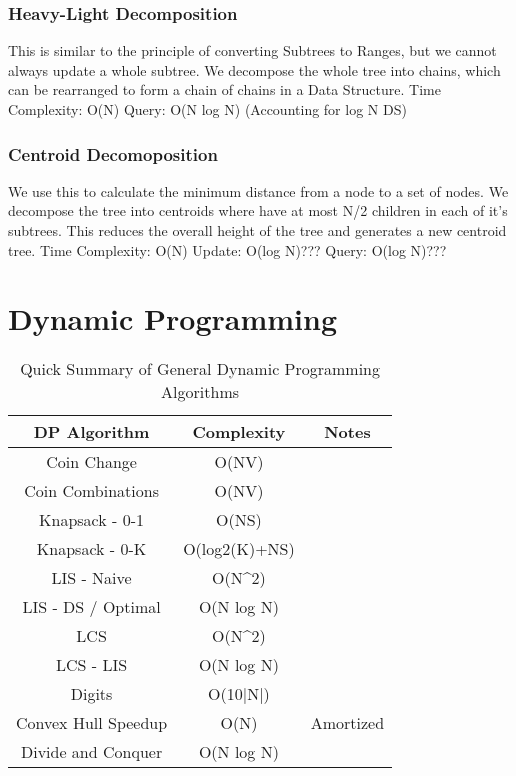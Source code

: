 \documentclass{article}
\begin{document}
\subsubsection{Heavy-Light Decomposition}
\begin{flushleft}
This is similar to the principle of converting Subtrees to Ranges, but
we cannot always update a whole subtree. We decompose the whole tree into chains,
which can be rearranged to form a chain of chains in a Data Structure.
\newline
Time Complexity: O(N)
Query: O(N log N) (Accounting for log N DS)
\end{flushleft}


\subsubsection{Centroid Decomoposition}
\begin{flushleft}
We use this to calculate the minimum distance from a node to a set of nodes.
We decompose the tree into centroids where have at most N/2 children in each of it's 
subtrees. This reduces the overall height of the tree and generates a new centroid tree.
\newline
Time Complexity: O(N)
Update: O(log N)???
Query: O(log N)???
\end{flushleft}


\section{Dynamic Programming}

\begin{table}[H]
\begin{tabular}{|c|c|c|}
\hline
DP Algorithm        & Complexity              & Notes     \\ \hline
Coin Change         & O(NV)                   &           \\ \hline
Coin Combinations   & O(NV)                   &           \\ \hline
Knapsack - 0-1      & O(NS)                   &           \\ \hline
Knapsack - 0-K      & O(log2(K)+NS)           &           \\ \hline
LIS - Naive         & O(N\textasciicircum{}2) &           \\ \hline
LIS - DS / Optimal  & O(N log N)              &           \\ \hline
LCS                 & O(N\textasciicircum{}2) &           \\ \hline
LCS - LIS           & O(N log N)              &           \\ \hline
Digits              & O(10|N|)                &           \\ \hline
Convex Hull Speedup & O(N)                    & Amortized \\ \hline
Divide and Conquer  & O(N log N)              &           \\ \hline
\end{tabular}
\caption{Quick Summary of General Dynamic Programming Algorithms}
\label{tab:dp}
\end{table}
\end{document}
